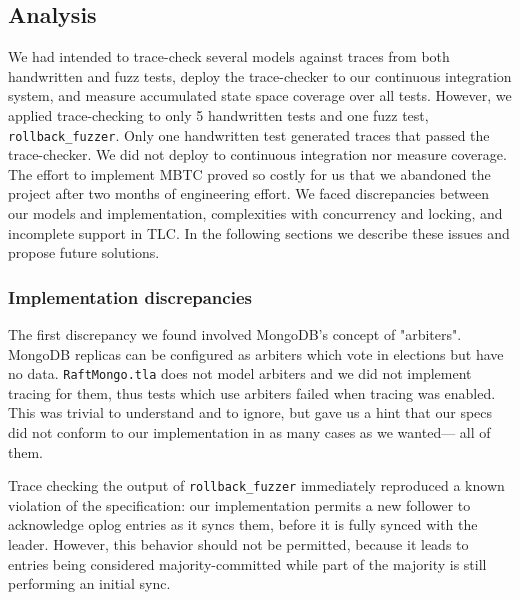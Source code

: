 \documentclass{vldb}
\begin{document}
\subsection{Analysis}
\label{subsec:mbtc_analysis}


We had intended to trace-check several models against traces from both handwritten and fuzz tests, deploy the trace-checker to our continuous integration system, and measure accumulated state space coverage over all tests. 
However, we applied trace-checking to only 5 handwritten tests and one fuzz test, \texttt{rollback\_fuzzer}. 
Only one handwritten test generated traces that passed the trace-checker. 
We did not deploy to continuous integration nor measure coverage. 
The effort to implement MBTC proved so costly for us that we abandoned the project after two months of engineering effort. 
We faced discrepancies between our models and implementation, complexities with concurrency and locking, and incomplete support in TLC. 
In the following sections we describe these issues and propose future solutions.

\subsubsection{Implementation discrepancies}
\label{subsubsec:mbtc_impl_discrepencies}

The first discrepancy we found involved MongoDB's concept of "arbiters".
MongoDB replicas can be configured as arbiters which vote in elections but have no data. 
\texttt{RaftMongo.tla} does not model arbiters and we did not implement tracing for them, thus tests which use arbiters failed when tracing was enabled.
This was trivial to understand and to ignore, but gave us a hint that our specs did not conform to our implementation in as many cases as we wanted--- all of them.

Trace checking the output of \texttt{rollback\_fuzzer} immediately reproduced a known violation \cite{SERVER-17934} of the specification: our implementation permits a new follower to acknowledge oplog entries as it syncs them, before it is fully synced with the leader.
However, this behavior should not be permitted, because it leads to entries being considered majority-committed while part of the majority is still performing an initial sync.
\end{document}

